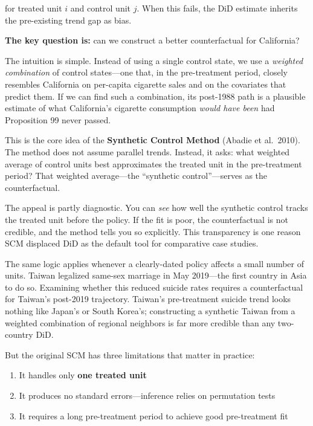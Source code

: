 \documentclass[12pt]{article}
\begin{document}
for treated unit $i$ and control unit $j$.
When this fails, the DiD estimate inherits the pre-existing trend gap as bias.

\textbf{The key question is:} can we construct a better counterfactual for California?

The intuition is simple.
Instead of using a single control state, we use a \emph{weighted combination} of
control states---one that, in the pre-treatment period, closely resembles California
on per-capita cigarette sales and on the covariates that predict them.
If we can find such a combination, its post-1988 path is a plausible estimate of
what California's cigarette consumption \emph{would have been} had Proposition 99 never passed.

This is the core idea of the \textbf{Synthetic Control Method} (Abadie et al.\ 2010).
The method does not assume parallel trends.
Instead, it asks: what weighted average of control units best approximates
the treated unit in the pre-treatment period?
That weighted average---the ``synthetic control''---serves as the counterfactual.

The appeal is partly diagnostic.
You can \emph{see} how well the synthetic control tracks the treated unit before the policy.
If the fit is poor, the counterfactual is not credible, and the method tells you so explicitly.
This transparency is one reason SCM displaced DiD as the default tool
for comparative case studies.

The same logic applies whenever a clearly-dated policy affects a small number of units.
Taiwan legalized same-sex marriage in May 2019---the first country in Asia to do so.
Examining whether this reduced suicide rates requires a counterfactual for Taiwan's
post-2019 trajectory.
Taiwan's pre-treatment suicide trend looks nothing like Japan's or South Korea's;
constructing a synthetic Taiwan from a weighted combination of regional neighbors
is far more credible than any two-country DiD.

But the original SCM has three limitations that matter in practice:

\begin{enumerate}
  \item It handles only \textbf{one treated unit}
  \item It produces no standard errors---inference relies on permutation tests
  \item It requires a long pre-treatment period to achieve good pre-treatment fit
\end{enumerate}
\end{document}
